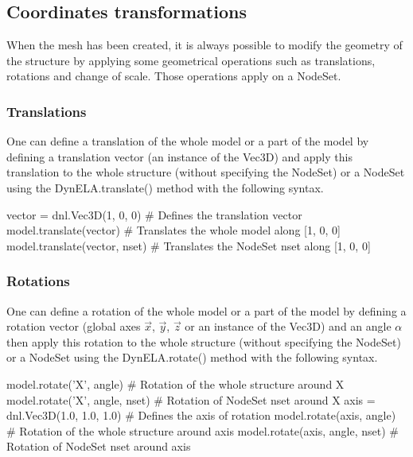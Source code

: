 \subsection{Coordinates transformations}

When the mesh has been created, it is always possible to modify the geometry of the structure by applying some geometrical operations such as translations, rotations and change of scale. Those operations apply on a \textsf{NodeSet}.

\subsubsection{Translations}

One can define a translation of the whole model or a part of the model by defining a translation vector (an instance of the \DynELA \textsf{Vec3D}) and apply this translation to the whole structure (without specifying the \textsf{NodeSet}) or a \textsf{NodeSet} using the \textsf{DynELA.translate()} method with the following syntax.

\begin{PythonListing}
vector = dnl.Vec3D(1, 0, 0)   # Defines the translation vector
model.translate(vector)       # Translates the whole model along [1, 0, 0]
model.translate(vector, nset) # Translates the NodeSet nset along [1, 0, 0]
\end{PythonListing}

\subsubsection{Rotations}

One can define a rotation of the whole model or a part of the model by defining a rotation vector (global axes $\overrightarrow{\ensuremath{x}}$, $\overrightarrow{y}$, $\overrightarrow{\ensuremath{z}}$ or an instance of the \DynELA \textsf{Vec3D}) and an angle $\alpha$ then apply this rotation to the whole structure (without specifying the \textsf{NodeSet}) or a \textsf{NodeSet} using the \textsf{DynELA.rotate()} method with the following syntax.

\begin{PythonListing}
model.rotate('X', angle)        # Rotation of the whole structure around X
model.rotate('X', angle, nset)  # Rotation of NodeSet nset around X
axis = dnl.Vec3D(1.0, 1.0, 1.0) # Defines the axis of rotation
model.rotate(axis, angle)       # Rotation of the whole structure around axis
model.rotate(axis, angle, nset) # Rotation of NodeSet nset around axis
\end{PythonListing}

